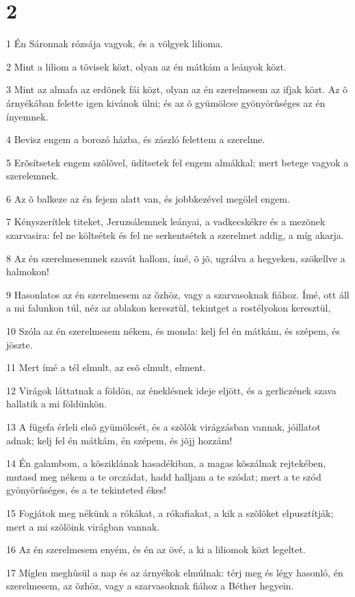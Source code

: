 \chapter{2}

\par 1 Én Sáronnak rózsája vagyok, és a völgyek lilioma.
\par 2 Mint a liliom a tövisek közt, olyan az én mátkám a leányok közt.
\par 3 Mint az almafa az erdõnek fái közt, olyan az én szerelmesem az ifjak közt. Az õ árnyékában felette igen kivánok ülni; és az õ gyümölcse gyönyörûséges az én ínyemnek.
\par 4 Bevisz engem a borozó házba, és zászló felettem a szerelme.
\par 5 Erõsítsetek engem szõlõvel, üdítsetek fel engem almákkal; mert betege vagyok a szerelemnek.
\par 6 Az õ balkeze az én fejem alatt van, és jobbkezével megölel engem.
\par 7 Kényszerítlek titeket, Jeruzsálemnek leányai, a vadkecskékre és a mezõnek szarvasira: fel ne költsétek és fel ne serkentsétek a szerelmet addig, a míg akarja.
\par 8 Az én szerelmesemnek szavát hallom, ímé, õ jõ, ugrálva a hegyeken, szökellve a halmokon!
\par 9 Hasonlatos az én szerelmesem az õzhöz, vagy a szarvasoknak fiához. Ímé, ott áll a mi falunkon túl, néz az ablakon keresztül, tekintget a rostélyokon keresztül,
\par 10 Szóla az én szerelmesem nékem, és monda: kelj fel én mátkám, és szépem, és jöszte.
\par 11 Mert ímé a tél elmult, az esõ elmult, elment.
\par 12 Virágok láttatnak a földön, az éneklésnek ideje eljött, és a gerliczének szava hallatik a mi földünkön.
\par 13 A fügefa érleli elsõ gyümölcsét, és a szõlõk virágzásban vannak, jóillatot adnak; kelj fel én mátkám, én szépem, és jõjj hozzám!
\par 14 Én galambom, a kõsziklának hasadékiban, a magas kõszálnak rejtekében, mutasd meg nékem a te orczádat, hadd halljam a te szódat; mert a te szód gyönyörûséges, és a te tekinteted ékes!
\par 15 Fogjátok meg nékünk a rókákat, a rókafiakat, a kik a szõlõket elpusztítják; mert a mi szõlõink virágban vannak.
\par 16 Az én szerelmesem enyém, és én az övé, a ki a liliomok közt legeltet.
\par 17 Míglen meghûsül a nap és az árnyékok elmúlnak: térj meg és légy hasonló, én szerelmesem, az õzhöz, vagy a szarvasoknak fiához a Béther hegyein.

